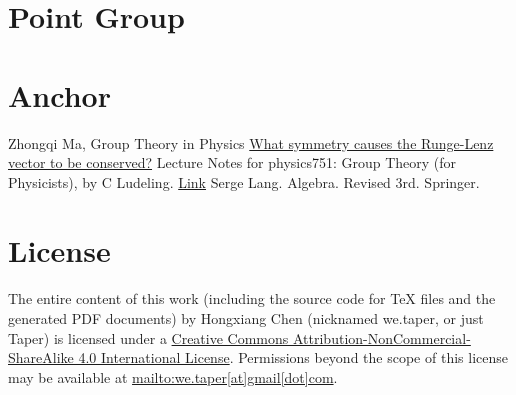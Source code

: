\documentclass{article}
\begin{document}
\section{Point Group}
\label{sec:Point-Group}



\section{Anchor}
\label{sec:Anchor}
\begin{thebibliography}{1}
     Zhongqi Ma, Group Theory in Physics
     \href{physics.stackexchange.com/questions/18088/what-symmetry-causes-the-runge-lenz-vector-to-be-conserved}{What symmetry causes the Runge-Lenz vector to be conserved?}
     Lecture Notes for physics751: Group Theory (for
    Physicists), by C Ludeling.
    \href{http://www.th.physik.uni-bonn.de/nilles/people/luedeling/grouptheory/data/grouptheorynotes.pdf}{Link}
     Serge Lang. Algebra. Revised 3rd. Springer.
\end{thebibliography}
\printnomenclature
\section{License}
The entire content of this work (including the source code
for TeX files and the generated PDF documents) by 
Hongxiang Chen (nicknamed we.taper, or just Taper) is
licensed under a 
\href{http://creativecommons.org/licenses/by-nc-sa/4.0/}{Creative 
Commons Attribution-NonCommercial-ShareAlike 4.0 International 
License}. Permissions beyond the scope of this 
license may be available at \url{mailto:we.taper[at]gmail[dot]com}.
\end{document}
